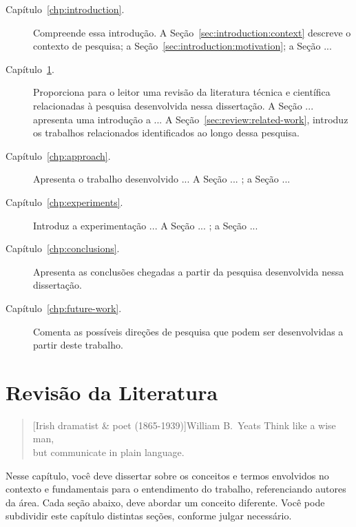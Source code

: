 \documentclass[final]{rc-book-2.14}
\begin{document}
\begin{description}

\item[Capítulo~\ref{chp:introduction}.] Compreende essa introdução. A Seção~\ref{sec:introduction:context} descreve o contexto de pesquisa; a Seção~\ref{sec:introduction:motivation}; a Seção ...

\item[Capítulo~\ref{chp:review}.] Proporciona para o leitor uma revisão da literatura técnica e científica relacionadas à pesquisa desenvolvida nessa dissertação. A Seção ... apresenta uma introdução a ... A Seção~\ref{sec:review:related-work}, introduz os trabalhos relacionados identificados ao longo dessa pesquisa.

\item[Capítulo~\ref{chp:approach}.] Apresenta o trabalho desenvolvido ... A Seção ... ; a Seção ...

\item[Capítulo~\ref{chp:experiments}.] Introduz a experimentação ... A Seção ... ; a Seção ... 

\item[Capítulo~\ref{chp:conclusions}.] Apresenta as conclusões chegadas a partir da pesquisa desenvolvida nessa dissertação.

\item[Capítulo~\ref{chp:future-work}.] Comenta as possíveis direções de pesquisa que podem ser desenvolvidas a partir deste trabalho.

\end{description}


\chapter{Revisão da Literatura}
\label{chp:review}

\begin{quotation}[Irish dramatist \& poet (1865-1939)]{William B.~Yeats}
    Think like a wise man, \\ but communicate in plain language.
\end{quotation}


\drop Nesse capítulo, você deve dissertar sobre os conceitos e termos envolvidos no contexto e fundamentais para o entendimento do trabalho, referenciando autores da área. Cada seção abaixo, deve abordar um conceito diferente. Você pode subdividir este capítulo distintas seções, conforme julgar necessário.
\end{document}
